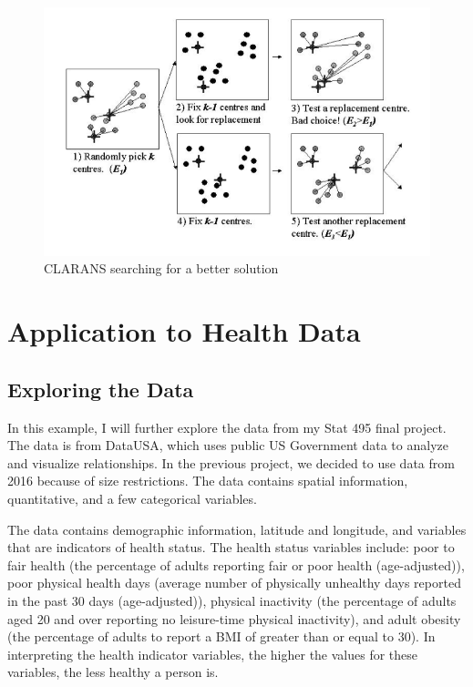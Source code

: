 \documentclass[12pt,twoside]{amherstthesis}
\begin{document}
  \begin{figure}[htbp]
  \centering
  \includegraphics[scale = 0.5,angle = 0]{clustering_pic.png}
  \caption[CLARANS searching for a better solution]{\normalsize{CLARANS searching for a better solution}}
  \label{fig:CLARANS}
  \end{figure}
  
  \chapter{Application to Health Data}\label{typeset-equ}
  
  \section{Exploring the Data}\label{exploring-the-data}
  
  In this example, I will further explore the data from my Stat 495 final
  project. The data is from DataUSA, which uses public US Government data
  to analyze and visualize relationships. In the previous project, we
  decided to use data from 2016 because of size restrictions. The data
  contains spatial information, quantitative, and a few categorical
  variables.
  
  The data contains demographic information, latitude and longitude, and
  variables that are indicators of health status. The health status
  variables include: poor to fair health (the percentage of adults
  reporting fair or poor health (age-adjusted)), poor physical health days
  (average number of physically unhealthy days reported in the past 30
  days (age-adjusted)), physical inactivity (the percentage of adults aged
  20 and over reporting no leisure-time physical inactivity), and adult
  obesity (the percentage of adults to report a BMI of greater than or
  equal to 30). In interpreting the health indicator variables, the higher
  the values for these variables, the less healthy a person is.
  
\end{document}
